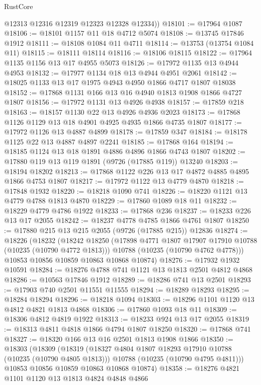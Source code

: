 \begin{lexlean}{RustCore}
\begin{coremodule}
        @12313
        @12316
        @12319
        @12323
        @12328
        @12334))
@18101 := @17964 @1087
@18106 := @18101 @1157 @11 @18 @4712 @5074
@18108 := @13745 @17846 @1912
@18111 := @18108 @1084 @11 @4711
@18114 := @13753 (@13754 @1084 @11)
@18115 := @18111 @18114
@18116 := @18106 @18115
@18122 := @17964 @1135 @1156 @13 @17 @4955 @5073
@18126 := @17972 @1135 @13 @4944 @4953
@18132 := @17977 @1134 @18 @13 @4944 @4951 @2061
@18142 := @18025 @1133 @13 @17 @1975 @4943 @4950 @1866 @4717 @1807 @18038
@18152 := @17868 @1131 @166 @13 @16 @4940 @1813 @1908 @1866 @4727 @1807
@18156 := @17972 @1131 @13 @4926 @4938
@18157 := @17859 @218
@18163 := @18157 @1130 @22 @13 @4926 @4936 @2023
@18173 := @17868 @1126 @1129 @13 @18 @4901 @4925 @4935 @1866 @4735 @1807
@18177 := @17972 @1126 @13 @4887 @4899
@18178 := @17859 @347
@18184 := @18178 @1125 @22 @13 @4887 @4897 @2241
@18185 := @17868 @164
@18194 := @18185 @1124 @13 @18 @1891 @4886 @4896 @1866 @4743 @1807
@18202 := @17880 @119 @13 @119 @1891 (@9726 (@17885 @119)) @13240
@18203 := @18194 @18202
@18213 := @17868 @1122 @226 @13 @17 @4872 @4885 @4895 @1866 @4753 @1807
@18217 := @17972 @1122 @13 @4779 @4870
@18218 := @17848 @1932
@18220 := @18218 @1090 @741
@18226 := @18220 @1121 @13 @4779 @4788 @1813 @4870
@18229 := @17860 @1089 @18 @11
@18232 := @18229 @4779 @4786 @1922
@18233 := @17868 @236
@18237 := @18233 @226 @13 @17 @2055
@18242 := @18237 @4778 @4785 @1866 @4761 @1807
@18250 := @17880 @215 @13 @215 @2055 (@9726 (@17885 @215)) @12836
@18274 := @18226
    (@18232
      (@18242
        @18250
        (@17898 @4771 @1807 @17907 @17910 @10788 (@10235 (@10790 @4772 @1813)))
        @10788
        (@10235 (@10790 @4762 @4778)))
      @10853
      @10856
      @10859
      @10863
      @10868
      @10874)
@18276 := @17932 @1932 @10591
@18284 := @18276 @4788 @741 @1121 @13 @1813 @2501 @4812 @4868
@18286 := @10563 @17846 @1912
@18289 := @18286 @741 @13 @2501
@18293 := @17903 @740 @2501 @11551 @11555
@18294 := @18289 @18293
@18295 := @18284 @18294
@18296 := @18218 @1094
@18303 := @18296 @1101 @1120 @13 @4812 @4821 @1813 @4868
@18306 := @17860 @1093 @18 @11
@18309 := @18306 @4812 @4819 @1922
@18313 := @18233 @924 @13 @17 @2055
@18319 := @18313 @4811 @4818 @1866 @4794 @1807 @18250
@18320 := @17868 @741
@18327 := @18320 @166 @13 @16 @2501 @1813 @1908 @1866
@18350 := @18303
    (@18309
      (@18319
        (@18327 @4804 @1807 @18293 @17910 @10788 (@10235 (@10790 @4805 @1813)))
        @10788
        (@10235 (@10790 @4795 @4811)))
      @10853
      @10856
      @10859
      @10863
      @10868
      @10874)
@18358 := @18276 @4821 @1101 @1120 @13 @1813 @4824 @4848 @4866

\end{coremodule}
\end{lexlean}
